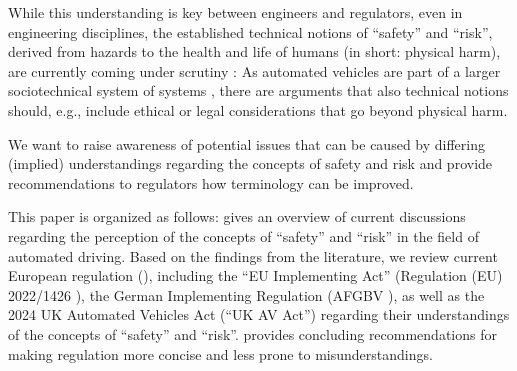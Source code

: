 While this understanding is key between engineers and regulators, even in engineering disciplines, the established technical notions of ``safety'' and ``risk'', derived from hazards to the health and life of humans (in short: physical harm), are currently coming under scrutiny \parencite{koopman2024}:
As automated vehicles are part of a larger sociotechnical system of systems \parencite{koopman2024,salem2024}, there are arguments that also technical notions should, e.g., include ethical or legal considerations that go beyond physical harm.

We want to raise awareness of potential issues that can be caused by differing (implied) understandings regarding the concepts of safety and risk and provide recommendations to regulators how terminology can be improved.

 This paper is organized as follows:  gives an overview of current discussions regarding the perception of the concepts of ``safety'' and ``risk'' in the field of automated driving.
Based on the findings from the literature, we review current European regulation (), including the ``EU Implementing Act'' (Regulation (EU) 2022/1426 \parencite{eu1426}), the German Implementing Regulation (AFGBV \parencite{afgbv}), as well as the 2024 UK Automated Vehicles Act \parencite{ukav2024} (``UK AV Act'') regarding their understandings of the concepts of ``safety'' and ``risk''.
 provides concluding recommendations for making  regulation more concise and less prone to misunderstandings.
